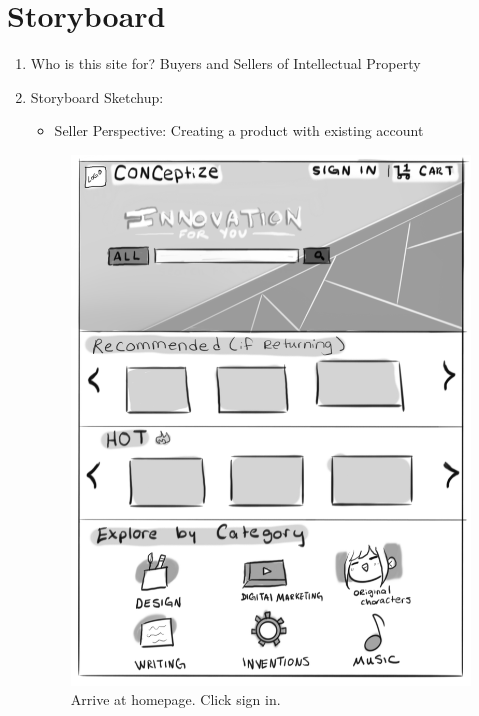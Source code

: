 \documentclass[]{article}
\begin{document}
\section{Storyboard}
	\begin{enumerate}
		\item Who is this site for? 
		Buyers and Sellers of Intellectual Property
		\item Storyboard Sketchup:
		\begin{itemize}
			\item Seller Perspective: Creating a product with existing account
		\end{itemize}
			\begin{figure}
			  \includegraphics[width=\linewidth]{./pictures/homepage.png}
			  \caption{Arrive at homepage. Click sign in.}
			  \label{fig:seller1}
			\end{figure}
			

\end{enumerate}
\end{document}
